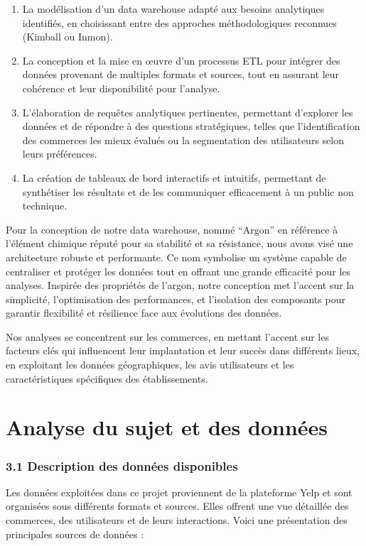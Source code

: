 \begin{enumerate}
\item La modélisation d’un data warehouse adapté aux besoins analytiques identifiés, en choisissant entre des approches méthodologiques reconnues (Kimball ou Inmon).
\item La conception et la mise en œuvre d’un processus ETL pour intégrer des données provenant de multiples formats et sources, tout en assurant leur cohérence et leur disponibilité pour l’analyse.
\item L’élaboration de requêtes analytiques pertinentes, permettant d'explorer les données et de répondre à des questions stratégiques, telles que l’identification des commerces les mieux évalués ou la segmentation des utilisateurs selon leurs préférences.
\item La création de tableaux de bord interactifs et intuitifs, permettant de synthétiser les résultats et de les communiquer efficacement à un public non technique.
\end{enumerate}

Pour la conception de notre data warehouse, nommé “Argon” en référence à l’élément chimique réputé pour sa stabilité et sa résistance, nous avons visé une architecture robuste et performante. Ce nom symbolise un système capable de centraliser et protéger les données tout en offrant une grande efficacité pour les analyses. Inspirée des propriétés de l’argon, notre conception met l’accent sur la simplicité, l’optimisation des performances, et l’isolation des composants pour garantir flexibilité et résilience face aux évolutions des données. 


Nos analyses se concentrent sur les commerces, en mettant l'accent sur les facteurs clés qui influencent leur implantation et leur succès dans différents lieux, en exploitant les données géographiques, les avis utilisateurs et les caractéristiques spécifiques des établissements.


\chapter*{Analyse du sujet et des données}


\subsection*{3.1 Description des données disponibles}
Les données exploitées dans ce projet proviennent de la plateforme Yelp et sont organisées sous différents formats et sources. Elles offrent une vue détaillée des commerces, des utilisateurs et de leurs interactions. Voici une présentation des principales sources de données :


